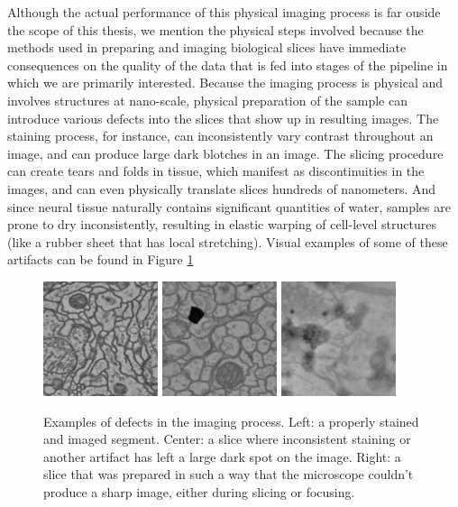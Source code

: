 Although the actual performance of this physical imaging process is far ouside the scope of this thesis, we mention the physical steps involved because the methods used in preparing and imaging biological slices have immediate consequences on the quality of the data that is fed into stages of the pipeline in which we are primarily interested. Because the imaging process is physical and involves structures at nano-scale, physical preparation of the sample can introduce various defects into the slices that show up in resulting images. The staining process, for instance, can inconsistently vary contrast throughout an image, and can produce large dark blotches in an image. The slicing procedure can create tears and folds in tissue, which manifest as discontinuities in the images, and can even physically translate slices hundreds of nanometers. And since neural tissue naturally contains significant quantities of water, samples are prone to dry inconsistently, resulting in elastic warping of cell-level structures (like a rubber sheet that has local stretching). Visual examples of some of these artifacts can be found in Figure \ref{fig:imaging_errors}

\begin{figure}
\centering
\includegraphics[width=0.3\textwidth]{img/normal_example.png}
\includegraphics[width=0.3\textwidth]{img/stain_error.png}
\includegraphics[width=0.3\textwidth]{img/blurred_example.png}
\caption[Examples of defects in the imaging process.]{Examples of defects in the imaging process. Left: a properly stained and imaged segment. Center: a slice where inconsistent staining or another artifact has left a large dark spot on the image. Right: a slice that was prepared in such a way that the microscope couldn't produce a sharp image, either during slicing or focusing.}
\label{fig:imaging_errors}
\end{figure}

